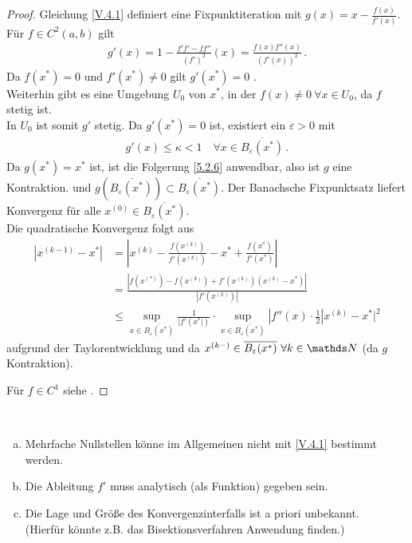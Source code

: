 \begin{proof}
	Gleichung \eqref{V.4.1} definiert eine Fixpunktiteration mit $g(x) = x-\frac{f(x)}{f'(x)}$.\\
	Für $f\in C^2(a,b)$ gilt 
	\begin{gather*}
	g'(x) = 1- \frac{f'f'-ff''}{(f')^2}(x)= \frac{f(x)f''(x)}{(f'(x))^2}\, .
	\end{gather*}
	Da $f(x^{*})= 0$ und $f'(x^{*})\neq 0$ gilt $g'(x^{*})=0$ .\\
	Weiterhin gibt es eine Umgebung $U_0$ von $x^{*}$, in der $f(x)\neq 0~\forall x\in U_0$,
	da $f$ stetig ist.\\
	In $U_0$ ist somit $g' $ stetig. Da $g'(x^{*})=0$ ist, existiert ein $\varepsilon>0$ mit
	\begin{gather*}
	g'(x)\leq \kappa<1 \quad \forall x\in \overline{B_\varepsilon(x^{*})}\, .
	\end{gather*}
	Da $g(x^{*})=x^{*}$ ist, ist die Folgerung \ref{5.2.6} anwendbar,
	also ist $g$ eine Kontraktion. und $g(\overline{B_\varepsilon(x^{*})}) \subset \overline{B_\varepsilon(x^{*})}$.
	Der Banachsche Fixpunktsatz liefert Konvergenz für alle $x^{(0)}\in\overline{B_\varepsilon(x^{*})}$. \\
	
	Die quadratische Konvergenz folgt aus 
	\begin{align*}
	|x^{(k-1)}-x^{*}| &= |x^{(k)}-\frac{f(x^{(k)})}{f'(x^{(k)})}-x^{*}+\frac{f(x^{*})}{f'(x^{*})}| \\
	&= \frac{|f(x^{(*)})-f(x^{(k)})+f'(x^{(k)})(x^{(k)}-x^{*})|}{|f'(x^{(k)})|}\\
	&\leq \sup_{x\in\overline{B_\varepsilon(x^{*})}}\frac{1}{|f'(x^{*}|)}
	\cdot \sup_{x\in\overline{B_\varepsilon(x^{*})}}|f''(x)\cdot\frac{1}{2}|x^{(k)}-x^{*}|^2
	\end{align*}
	aufgrund der Taylorentwicklung und da
	$x^{(k-)}\in\overline{B_\varepsilon(x^{*})}~\forall k\in\N$ (da $g$ Kontraktion).
	
	Für $f\in C^1$ siehe \cite{haemmerlinhoffmann}.
\end{proof}

\begin{Beme}~
	\begin{enumerate}[a)]
		\item Mehrfache Nullstellen könne im Allgemeinen
		nicht mit \eqref{V.4.1} bestimmt werden.
		\item Die Ableitung $f'$ muss analytisch (als Funktion) gegeben sein.
		\item Die Lage und Größe des Konvergenzinterfalls ist a priori unbekannt.\\
		(Hierfür könnte z.B. das Bisektionsverfahren Anwendung finden.)
	\end{enumerate}
\end{Beme}



